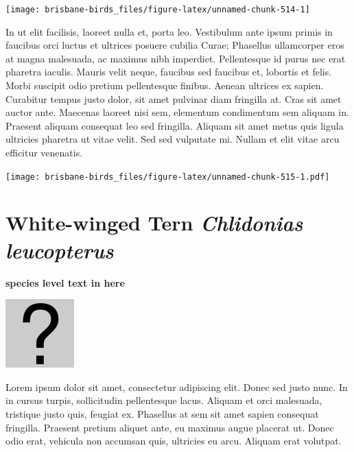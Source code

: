 \documentclass[]{book}
\let\origfigure\figure
\let\endorigfigure\endfigure
\renewenvironment{figure}[1][2] {
  \expandafter\origfigure\expandafter[H]
} {
  \endorigfigure
}
\begin{document}
\begin{figure}
\texttt{[image: brisbane-birds\_files/figure-latex/unnamed-chunk-514-1]} \caption{insert figure caption}\label{fig:unnamed-chunk-514}
\end{figure}

In ut elit facilisis, laoreet nulla et, porta leo. Vestibulum ante ipsum
primis in faucibus orci luctus et ultrices posuere cubilia Curae;
Phasellus ullamcorper eros at magna malesuada, ac maximus nibh
imperdiet. Pellentesque id purus nec erat pharetra iaculis. Mauris velit
neque, faucibus sed faucibus et, lobortis et felis. Morbi suscipit odio
pretium pellentesque finibus. Aenean ultrices ex sapien. Curabitur
tempus justo dolor, sit amet pulvinar diam fringilla at. Cras sit amet
auctor ante. Maecenas laoreet nisi sem, elementum condimentum sem
aliquam in. Praesent aliquam consequat leo sed fringilla. Aliquam sit
amet metus quis ligula ultricies pharetra ut vitae velit. Sed sed
vulputate mi. Nullam et elit vitae arcu efficitur venenatis.

\begin{figure}
\centering
\texttt{[image: brisbane-birds\_files/figure-latex/unnamed-chunk-515-1.pdf]}
\caption{\label{fig:unnamed-chunk-515}insert figure caption}
\end{figure}

\section{\texorpdfstring{White-winged Tern \emph{Chlidonias
leucopterus}}{White-winged Tern Chlidonias leucopterus}}\label{white-winged-tern-chlidonias-leucopterus}

\textbf{species level text in here}

\begin{figure}
\centering
\includegraphics{assets/missing.png}
\caption{No image for species}
\end{figure}

Lorem ipsum dolor sit amet, consectetur adipiscing elit. Donec sed justo
nunc. In in cursus turpis, sollicitudin pellentesque lacus. Aliquam et
orci malesuada, tristique justo quis, feugiat ex. Phasellus at sem sit
amet sapien consequat fringilla. Praesent pretium aliquet ante, eu
maximus augue placerat ut. Donec odio erat, vehicula non accumsan quis,
ultricies eu arcu. Aliquam erat volutpat.
\end{document}
